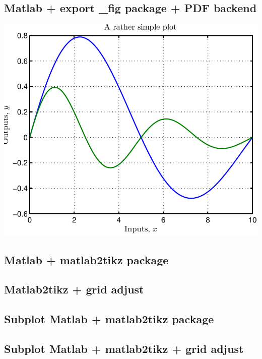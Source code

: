 \documentclass[10pt,a4paper,oneside,onecolumn]{article}
\begin{document}
\subsection{Matlab + export \_fig package + PDF backend}
\begin{center}
\includegraphics{simple_plot/figure_matlab_export_fig.pdf}
\end{center}

\subsection{Matlab + matlab2tikz package}
\begin{center}

\end{center}

\subsection{Matlab2tikz + grid adjust}
\begin{center}

\end{center}

\subsection{Subplot Matlab + matlab2tikz package}
\begin{center}

\end{center}

\subsection{Subplot Matlab + matlab2tikz + grid adjust}
\begin{center}

\end{center}
\end{document}
